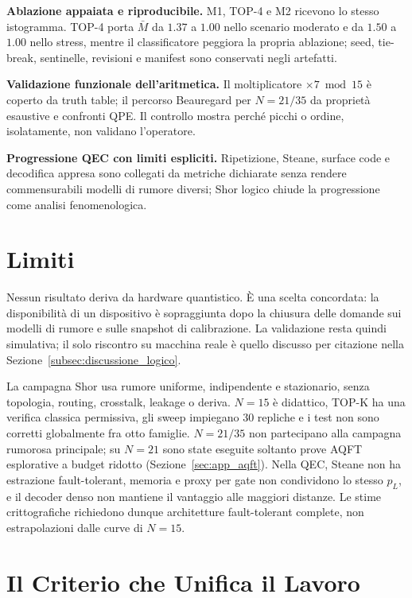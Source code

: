 \begin{onehalfspace}
\textbf{Ablazione appaiata e riproducibile.}
M1, TOP-4 e M2 ricevono lo stesso istogramma. TOP-4 porta $\bar M$ da $1.37$ a
$1.00$ nello scenario moderato e da $1.50$ a $1.00$ nello stress, mentre il
classificatore peggiora la propria ablazione; seed, tie-break, sentinelle,
revisioni e manifest sono conservati negli artefatti.

\textbf{Validazione funzionale dell'aritmetica.}
Il moltiplicatore $\times7\bmod15$ è coperto da truth table; il percorso
Beauregard per $N=21/35$ da proprietà esaustive e confronti QPE. Il controllo
mostra perché picchi o ordine, isolatamente, non validano l'operatore.

\textbf{Progressione QEC con limiti espliciti.}
Ripetizione, Steane, surface code e decodifica appresa sono collegati da
metriche dichiarate senza rendere commensurabili modelli di rumore diversi;
Shor logico chiude la progressione come analisi fenomenologica.

\section{Limiti}
\label{sec:limiti_finali}

Nessun risultato deriva da hardware quantistico. È una scelta concordata: la
disponibilità di un dispositivo è sopraggiunta dopo la chiusura delle domande
sui modelli di rumore e sulle snapshot di calibrazione. La validazione resta
quindi simulativa; il solo riscontro su macchina reale è quello discusso per
citazione nella Sezione~\ref{subsec:discussione_logico}.

La campagna Shor usa rumore uniforme, indipendente e stazionario, senza
topologia, routing, crosstalk, leakage o deriva. $N=15$ è didattico, TOP-K ha
una verifica classica permissiva, gli sweep impiegano 30 repliche e i test non
sono corretti globalmente fra otto famiglie. $N=21/35$ non partecipano
alla campagna rumorosa principale; su $N=21$ sono state eseguite soltanto
prove AQFT esplorative a budget ridotto (Sezione~\ref{sec:app_aqft}).
Nella QEC, Steane non ha estrazione fault-tolerant, memoria e proxy per
gate non condividono lo stesso $p_L$, e il decoder denso non mantiene il
vantaggio alle maggiori distanze. Le stime crittografiche richiedono dunque
architetture fault-tolerant complete, non estrapolazioni dalle curve di $N=15$.

\section{Il Criterio che Unifica il Lavoro}


\end{onehalfspace}
